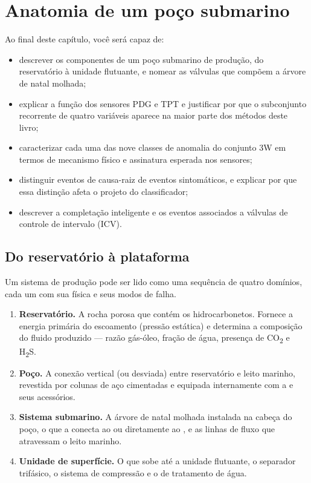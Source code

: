 \chapter{Anatomia de um poço submarino}
\label{cap:dominio}

\begin{objetivos}
Ao final deste capítulo, você será capaz de:
\begin{itemize}[leftmargin=*,itemsep=0.2em]
  \item descrever os componentes de um poço submarino de produção, do reservatório à
        unidade flutuante, e nomear as válvulas que compõem a árvore de natal molhada;
  \item explicar a função dos sensores PDG e TPT e justificar por que o subconjunto
        recorrente de quatro variáveis aparece na maior parte dos métodos deste livro;
  \item caracterizar cada uma das nove classes de anomalia do conjunto 3W em termos de
        mecanismo físico e assinatura esperada nos sensores;
  \item distinguir eventos de causa-raiz de eventos sintomáticos, e explicar por que
        essa distinção afeta o projeto do classificador;
  \item descrever a completação inteligente e os eventos associados a válvulas de
        controle de intervalo (ICV).
\end{itemize}
\end{objetivos}

\section{Do reservatório à plataforma}

Um sistema de produção  pode ser lido como uma sequência de quatro
domínios, cada um com sua física e seus modos de falha.

\begin{enumerate}[leftmargin=*,itemsep=0.5em]
  \item \textbf{Reservatório.} A rocha porosa que contém os hidrocarbonetos. Fornece a
        energia primária do escoamento (pressão estática) e determina a composição do
        fluido produzido --- razão gás-óleo, fração de água, presença de
        CO\textsubscript{2} e H\textsubscript{2}S.
  \item \textbf{Poço.} A conexão vertical (ou desviada) entre reservatório e leito
        marinho, revestida por colunas de aço cimentadas e equipada internamente com a
         e seus acessórios.
  \item \textbf{Sistema submarino.} A árvore de natal molhada instalada na cabeça do
        poço, o  que a conecta ao  ou diretamente ao
        , e as linhas de fluxo que atravessam o leito marinho.
  \item \textbf{Unidade de superfície.} O  que sobe até a unidade flutuante,
        o separador trifásico, o sistema de compressão e o de tratamento de água.
\end{enumerate}

